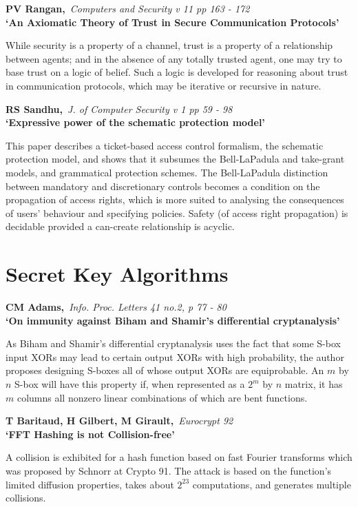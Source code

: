 {\bf \noindent PV Rangan,}{\em ~Computers and Security v 11 pp 163 - 172\\}
{\bf `An Axiomatic Theory of Trust in Secure Communication Protocols'}

While security is a property of a channel, trust is a property of a 
relationship between agents; and in the absence of any totally trusted 
agent, one may try to base trust on a logic of belief. Such a logic is 
developed for reasoning about trust in communication protocols, which 
may be iterative or recursive in nature.

{\bf \noindent RS Sandhu,}{\em ~J. of Computer Security v 1 pp 59 - 98\\}
{\bf `Expressive power of the schematic protection model'}

This paper describes a ticket-based access control formalism, the schematic 
protection model, and shows that it subsumes the Bell-LaPadula and take-grant 
models, and grammatical protection schemes. The Bell-LaPadula distinction 
between mandatory and discretionary controls becomes a condition on the
propagation of access rights, which is more suited to analysing the
consequences of users' behaviour and specifying policies. Safety (of access
right propagation) is decidable provided a can-create relationship is acyclic.



\pagebreak

\normalsize
\section{Secret Key Algorithms}
\small

{\bf \noindent CM Adams,}{\em ~Info. Proc. Letters 41 no.2, p 77 - 80\\}
{\bf `On immunity against Biham and Shamir's differential cryptanalysis'}

As Biham and Shamir's differential cryptanalysis uses the fact that some
S-box input XORs may lead to certain output XORs with high probability, the
author proposes designing S-boxes all of whose output XORs are equiprobable.
An $m$ by $n$ S-box will have this property if, when represented as a $2^m$
by $n$ matrix, it has $m$ columns all nonzero linear combinations of which
are bent functions.

{\bf \noindent T Baritaud, H Gilbert, M Girault,}{\em ~Eurocrypt 92\\}
{\bf `FFT Hashing is not Collision-free'}

A collision is exhibited for a hash function based on fast Fourier transforms
which was proposed by Schnorr at Crypto 91. The attack is based on the 
function's limited diffusion properties, takes about $2^{23}$ computations, 
and generates multiple collisions.

